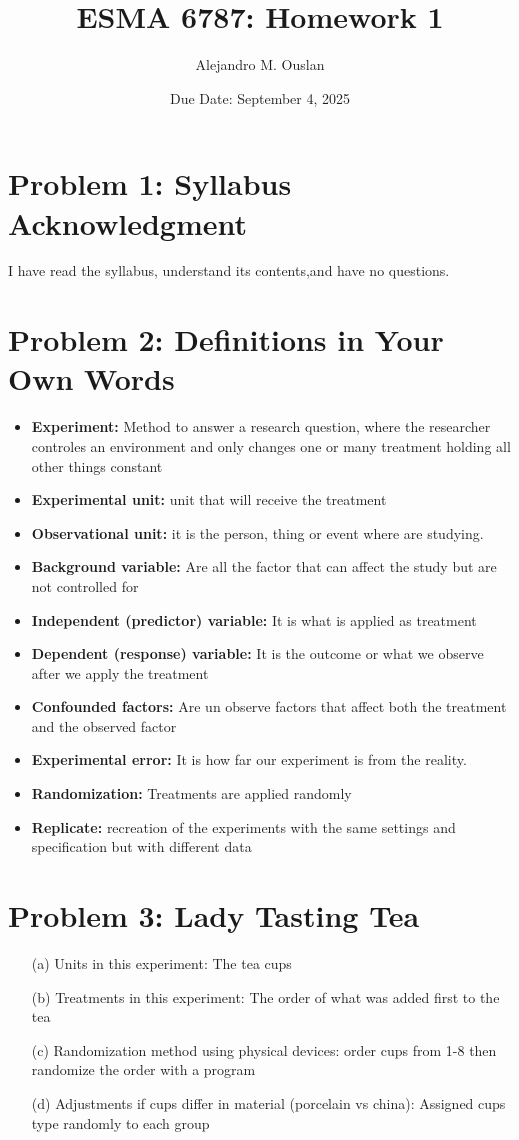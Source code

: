 \documentclass[10pt, oneside]{article}
\title{ESMA 6787: Homework 1}
\author{Alejandro M. Ouslan}
\date{Due Date: September 4, 2025}
\begin{document}
\maketitle

\vspace{.25in}

\section*{Problem 1: Syllabus Acknowledgment}
I have read the syllabus, understand its contents,and have no questions.


\section*{Problem 2: Definitions in Your Own Words}
\begin{itemize}
	\item \textbf{Experiment:} Method to answer a research question, where the researcher controles an 
    environment and only changes one or many treatment holding all other things constant
	\item \textbf{Experimental unit:} unit that will receive the treatment
	\item \textbf{Observational unit:}  it is the person, thing or event where are studying. 
	\item \textbf{Background variable:} Are all the factor that can affect the study but are not controlled for 
	\item \textbf{Independent (predictor) variable:} It is what is applied as treatment
	\item \textbf{Dependent (response) variable:} It is the outcome or what we observe after we apply the treatment
	\item \textbf{Confounded factors:} Are un observe factors that affect both the treatment and the observed factor
	\item \textbf{Experimental error:} It is how far our experiment is from the reality.
	\item \textbf{Randomization:} Treatments are applied randomly
	\item \textbf{Replicate:} recreation of the experiments with the same settings and specification but with different data 
\end{itemize}

\section*{Problem 3: Lady Tasting Tea}
\begin{itemize}
	\item[(a)] Units in this experiment: The tea cups
	\item[(b)] Treatments in this experiment: The order of what was added first to the tea
	\item[(c)] Randomization method using physical devices: order cups from 1-8 then randomize the order with a program
	\item[(d)] Adjustments if cups differ in material (porcelain vs china): Assigned cups type randomly to each group
\end{itemize}
\end{document}
